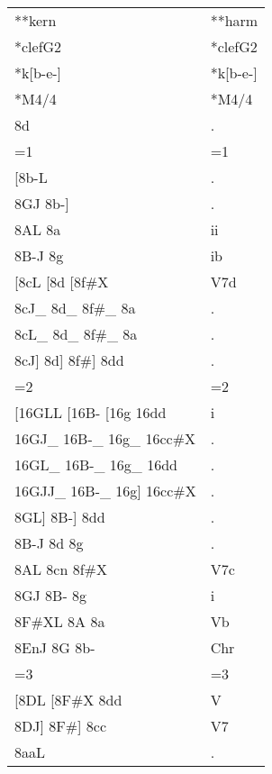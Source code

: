 \begin{tabular}{ll}
**kern                        & **harm       \\
*clefG2                       & *clefG2      \\
*k{[}b-e-{]}                  & *k{[}b-e-{]} \\
*M4/4                         & *M4/4        \\
8d                            & .            \\
=1                            & =1           \\
{[}8b-L                       & .            \\
8GJ 8b-{]}                    & .            \\
8AL 8a                        & ii           \\
8B-J 8g                       & ib           \\
{[}8cL {[}8d {[}8f\#X         & V7d          \\
8cJ\_ 8d\_ 8f\#\_ 8a          & .            \\
8cL\_ 8d\_ 8f\#\_ 8a          & .            \\
8cJ{]} 8d{]} 8f\#{]} 8dd      & .            \\
=2                            & =2           \\
{[}16GLL {[}16B- {[}16g 16dd  & i            \\
16GJ\_ 16B-\_ 16g\_ 16cc\#X   & .            \\
16GL\_ 16B-\_ 16g\_ 16dd      & .            \\
16GJJ\_ 16B-\_ 16g{]} 16cc\#X & .            \\
8GL{]} 8B-{]} 8dd             & .            \\
8B-J 8d 8g                    & .            \\
8AL 8cn 8f\#X                 & V7c          \\
8GJ 8B- 8g                    & i            \\
8F\#XL 8A 8a                  & Vb           \\
8EnJ 8G 8b-                   & Chr          \\
=3                            & =3           \\
{[}8DL {[}8F\#X 8dd           & V            \\
8DJ{]} 8F\#{]} 8cc            & V7           \\
8aaL                          & .            \\

\end{tabular}
